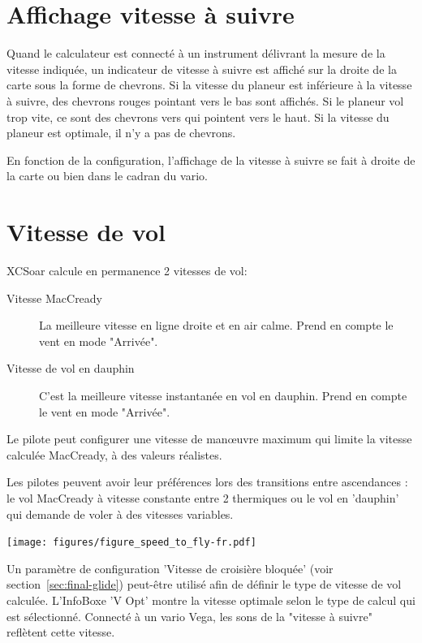 \section{Affichage vitesse à suivre}

Quand le calculateur est connecté à un instrument délivrant la mesure de la vitesse indiquée, un indicateur de vitesse à suivre est affiché sur la droite de la carte sous la forme de chevrons. Si la vitesse du planeur est inférieure à la vitesse à suivre, des chevrons rouges pointant vers le bas sont affichés. Si le planeur vol trop vite, ce sont des chevrons vers qui pointent vers le haut. Si la vitesse du planeur est optimale, il n'y a pas de chevrons.

En fonction de la configuration, l'affichage de la vitesse à suivre se fait à droite de la carte ou bien dans le cadran du vario.

\section{Vitesse de vol}\label{sec:stf}

XCSoar calcule en permanence 2 vitesses de vol:
\begin{description}
\item[Vitesse MacCready]  La meilleure vitesse en ligne droite et en air calme. Prend en compte le vent en mode "Arrivée".
\item[Vitesse de vol en dauphin]  C'est la meilleure vitesse instantanée en vol en dauphin. Prend en compte le vent en mode "Arrivée".
\end{description}  

Le pilote peut configurer une vitesse de manœuvre maximum qui limite la vitesse calculée MacCready, à des valeurs réalistes.

Les pilotes peuvent avoir leur préférences lors des transitions entre ascendances : le vol MacCready à vitesse constante entre 2 thermiques ou le vol en 'dauphin' qui demande de voler à des vitesses variables.

\begin{center}
\texttt{[image: figures/figure\_speed\_to\_fly-fr.pdf]}
\end{center}

Un paramètre de configuration 'Vitesse de croisière bloquée' (voir section~\ref{sec:final-glide}) peut-être utilisé afin de définir le type de vitesse de vol calculée. L'InfoBoxe 'V Opt' montre la vitesse optimale selon le type de calcul qui est sélectionné. Connecté à un vario Vega, les sons de la "vitesse à suivre"  reflètent cette vitesse.  

